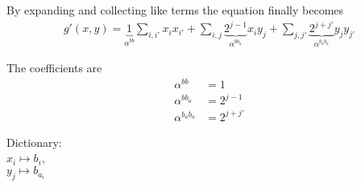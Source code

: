 \documentclass[a4paper,11pt]{article}
\begin{document}
\noindent By expanding and collecting like terms the equation finally becomes
\begin{equation}
\begin{split}
\left.
g'(x,y)
\right.
= \underbrace{1}_{\alpha^{bb}}\sum_{i,i'}x_i x_{i'}
+ \sum_{i,j}\underbrace{2^{j-1}}_{\alpha^{bb_a}} x_i y_j
+ \sum_{j,j'}\underbrace{2^{j+j'}}_{\alpha^{b_ab_a}}y_j y_{j'}
\end{split}
\end{equation}

\noindent The coefficients are
\begin{subequations}
\begin{align}
\alpha^{bb} &= 1\\
\alpha^{bb_a} &= 2^{j-1}\\
\alpha^{b_ab_a} &= 2^{j+j'}
\end{align}
\end{subequations}

\noindent Dictionary:\\
$x_i\mapsto b_i$,\\
$y_j\mapsto b_{a_i}$\\
\end{document}

